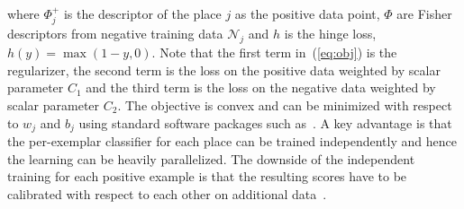 \documentclass[table]{article} %
\begin{document}
	  	where $\Phi^+_j$ is the descriptor of the place $j$ as the positive data point, $\Phi$ are Fisher descriptors from negative training data $\mathcal N_j$ and $h$ is the hinge loss, $h(y) = \max(1-y,0)$. Note that the first term in~(\ref{eq:obj}) is the regularizer, the second term is the loss on the positive data weighted by scalar parameter $C_1$ and the third term is the loss on the negative data weighted by scalar parameter $C_2$. The objective is convex and can be minimized with respect to $w_j$ and $b_j$ using standard software packages such as~\cite{libsvm}. A key advantage is that the per-exemplar classifier for each place can be trained independently and hence the learning can be heavily parallelized. The downside of the independent training for each positive example is that the resulting scores have to be calibrated with respect to each other on additional data~\cite{Gronat13,Malisiewicz11}.

%
%
\end{document}
